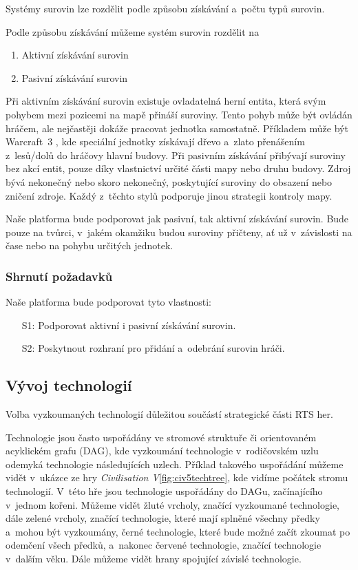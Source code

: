 Systémy surovin lze rozdělit podle způsobu získávání a~počtu typů surovin.

Podle způsobu získávání můžeme systém surovin rozdělit na
\begin{enumerate}
	\item Aktivní získávání surovin
	\item Pasivní získávání surovin
\end{enumerate}

Při aktivním získávání surovin existuje ovladatelná herní entita, která svým pohybem mezi pozicemi na mapě přináší suroviny. Tento pohyb může být ovládán hráčem, ale nejčastěji dokáže pracovat jednotka samostatně. Příkladem může být Warcraft~3 \citep{site:warcraft3}, kde speciální jednotky získávají dřevo a~zlato přenášením z~lesů/dolů do hráčovy hlavní budovy. Při pasivním získávání přibývají suroviny bez akcí entit, pouze díky vlastnictví určité části mapy nebo druhu budovy. Zdroj bývá nekonečný nebo skoro nekonečný, poskytující suroviny do obsazení nebo zničení zdroje. Každý z~těchto stylů podporuje jinou strategii kontroly mapy.

Naše platforma bude podporovat jak pasivní, tak aktivní získávání surovin. Bude pouze na tvůrci, v~jakém okamžiku budou suroviny přičteny, ať už v~závislosti na čase nebo na pohybu určitých jednotek. 

\subsubsection{Shrnutí požadavků}

Naše platforma bude podporovat tyto vlastnosti:
\begin{itemize}
	\item[S1:] Podporovat aktivní i pasivní získávání surovin.
	\item[S2:] Poskytnout rozhraní pro přidání a~odebrání surovin hráči.
\end{itemize}

\subsection{Vývoj technologií}
\label{sec:vyzkum}
Volba vyzkoumaných technologií důležitou součástí strategické části RTS her. 

Technologie jsou často uspořádány ve stromové struktuře či orientovaném acyklickém grafu (DAG), kde vyzkoumání technologie v~rodičovském uzlu odemyká technologie následujících uzlech. Příklad takového uspořádání můžeme vidět v~ukázce ze hry \emph{Civilisation V}\citep{site:civ5}\ref{fig:civ5techtree}, kde vidíme počátek stromu technologií. V~této hře jsou technologie uspořádány do DAGu, začínajícího v~jednom kořeni. Můžeme vidět žluté vrcholy, značící vyzkoumané technologie, dále zelené vrcholy, značící technologie, které mají splněné všechny předky a~mohou být vyzkoumány, černé technologie, které bude možné začít zkoumat po odemčení všech předků, a~nakonec červené technologie, značící technologie v~dalším věku. Dále můžeme vidět hrany spojující závislé technologie. 


